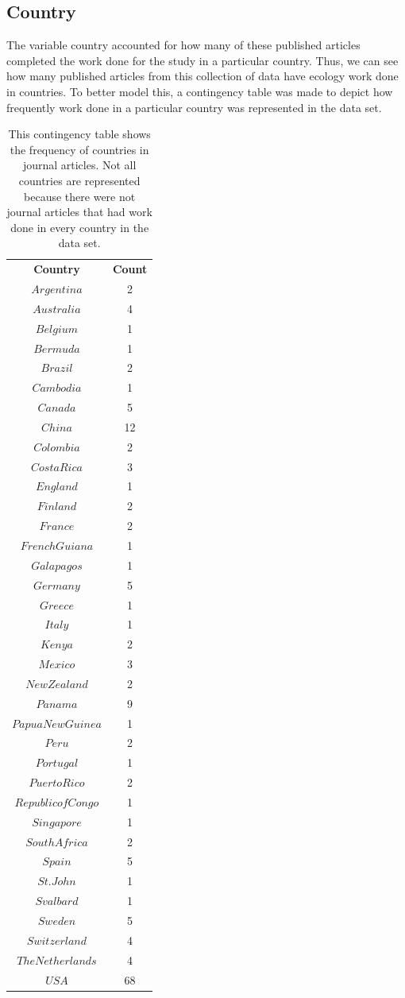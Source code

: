 \documentclass[12pt, letterpaper]{article}
\begin{document}
\pagebreak

\subsection{Country}
The variable country accounted for how many of these published articles completed the work done for the study in a particular country. Thus, we can see how many published articles from this collection of data have ecology work done in countries. To better model this, a contingency table was made to depict how frequently work done in a particular country was represented in the data set.
\begin{table}[h]
\begin{center}
\begin{tabular}{|c|c|}
\textbf{Country} & \textbf{Count}\\
$Argentina$ & 2\\
$Australia$ & 4\\
$Belgium$ & 1\\
$Bermuda$ & 1\\
$Brazil$ & 2\\
$Cambodia$ & 1\\
$Canada$ & 5\\
$China$ & 12\\
$Colombia$ & 2\\
$Costa Rica$ & 3\\
$England$ & 1\\
$Finland$ & 2\\
$France$ & 2\\
$French Guiana$ & 1\\
$Galapagos$ & 1\\
$Germany$ &  5\\
$Greece$ &  1\\
$Italy$ & 1\\
$Kenya$ & 2\\
$Mexico$ & 3\\
$New Zealand$ & 2\\
$Panama$ & 9\\
$Papua New Guinea$ &  1\\
$Peru$ &  2\\
$Portugal$ & 1\\
$Puerto Rico$ & 2\\
$Republic of Congo$ & 1\\
$Singapore$ & 1\\
$South Africa$ & 2\\
$Spain$ &  5\\
$St. John$ &  1\\
$Svalbard$ & 1\\
$Sweden$ & 5\\
$Switzerland$ & 4\\
$The Netherlands$ & 4\\
$USA$ & 68\\
\end{tabular}
\end{center}
\caption{This contingency table shows the frequency of countries in journal articles. Not all countries are represented because there were not journal articles that had work done in every country in the data set.}
\label{fig: Contingency Table for Country}
\end{table}
\end{document}
